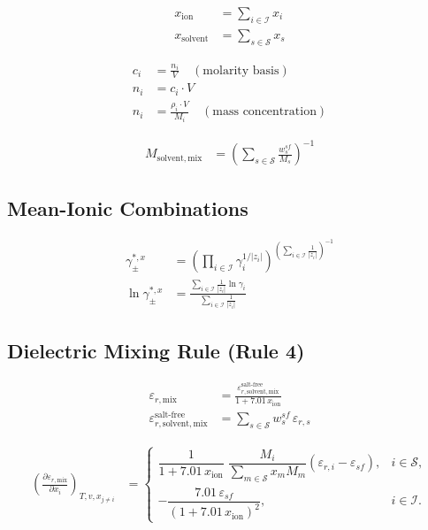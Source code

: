 \documentclass[12pt, letterpaper]{article}
\begin{document}
\begin{align}
x_{\mathrm{ion}} &= \sum_{i \in \mathcal{I}} x_i \\
x_{\mathrm{solvent}} &= \sum_{s \in \mathcal{S}} x_s
\end{align}

\begin{align}
c_i &= \frac{n_i}{V} \quad (\text{molarity basis}) \\
n_i &= c_i \cdot V \\
n_i &= \frac{\rho_i \cdot V}{M_i} \quad (\text{mass concentration})
\end{align}

\begin{align}
M_{\mathrm{solvent, mix}} &= \left(\sum_{s \in \mathcal{S}} \frac{w_{s}^{sf}}{M_s}\right)^{-1}
\end{align}

\subsection{Mean-Ionic Combinations}

\begin{align}
\gamma_{\pm}^{*,x} &= \left( \prod_{i \in \mathcal{I}} \gamma_i^{1/|z_i|} \right)^{\left(\sum_{i \in \mathcal{I}} \frac{1}{|z_i|}\right)^{-1}} \\
\ln \gamma_{\pm}^{*,x} &= \frac{\sum_{i \in \mathcal{I}} \frac{1}{|z_i|} \ln \gamma_i}{\sum_{i \in \mathcal{I}} \frac{1}{|z_i|}}
\end{align}

\subsection{Dielectric Mixing Rule (Rule 4)}

\begin{align}
\varepsilon_{r,\mathrm{mix}} &= \frac{\varepsilon_{r,\mathrm{solvent,mix}}^{\mathrm{salt\text{-}free}}}{1 + 7.01 \, x_{\mathrm{ion}}} \\
\varepsilon_{r,\mathrm{solvent,mix}}^{\mathrm{salt\text{-}free}} &= \sum_{s \in \mathcal{S}} w_{s}^{sf} \, \varepsilon_{r,s}
\end{align}

\begin{align}
\left(\frac{\partial \varepsilon_{r,\mathrm{mix}}}{\partial x_i}\right)_{T,v,x_{j\neq i}} &=
\begin{cases}
\dfrac{1}{1+7.01\,x_{\mathrm{ion}}}\;\dfrac{M_i}{\sum_{m\in\mathcal{S}} x_m M_m}\left(\varepsilon_{r,i}-\varepsilon_{sf}\right), & i\in\mathcal{S},\\[10pt]
-\dfrac{7.01\,\varepsilon_{sf}}{(1+7.01\,x_{\mathrm{ion}})^2}, & i\in\mathcal{I}.
\end{cases}
\end{align}



\printbibliography
\end{document}
